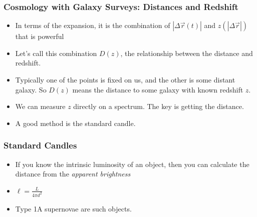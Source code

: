 \documentclass{beamer}
\begin{document}
\frame
{

    \frametitle{Cosmology with Galaxy Surveys: Distances and Redshift}


    \begin{itemize}

        \item In terms of the expansion, it is the combination of {\color{gold}
            $|\Delta \vec{r} (t)| $ } and {\color{gold} $z(|\Delta \vec{r}|)$}
            that is powerful


        \item Let's call this combination  {\color{gold} $D(z)$}, the relationship
            between the distance and redshift.

        \item Typically one of the points is fixed on us, and the other is
            some distant galaxy. So {\color{gold} $D(z)$} means the distance
            to some galaxy with known redshift $z$.

        \item We can measure $z$ directly on a spectrum.  The key is getting
            the distance.

        \item A good  method is the standard candle.

    \end{itemize}

}

\frame
{

    \frametitle{Standard Candles}


    \begin{itemize}

        \item If you know the intrinsic luminosity of an object, then you can
            calculate the distance from the {\em apparent brightness}

        \item {\color{gold} $\ell = \frac{L}{4 \pi d^2}$ }

        \item Type 1A supernovae are such objects.

    \end{itemize}

}
\end{document}

